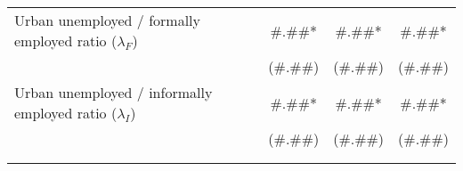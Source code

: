 \begin{tabular}{lrrr}
Urban unemployed / formally employed ratio ($\lambda_{F}$) & \multicolumn{1}{c}{\#.\#\#*} & \multicolumn{1}{c}{\#.\#\#*} & \multicolumn{1}{c}{\#.\#\#*} \\
      & \multicolumn{1}{c}{(\#.\#\#)} & \multicolumn{1}{c}{(\#.\#\#)} & \multicolumn{1}{c}{(\#.\#\#)} \\
Urban unemployed / informally employed ratio ($\lambda_{I}$) & \multicolumn{1}{c}{\#.\#\#*} & \multicolumn{1}{c}{\#.\#\#*} & \multicolumn{1}{c}{\#.\#\#*} \\
      & \multicolumn{1}{c}{(\#.\#\#)} & \multicolumn{1}{c}{(\#.\#\#)} & \multicolumn{1}{c}{(\#.\#\#)} \\
      &       &       &  \\
\bottomrule &       &       &  \\
\end{tabular}%
